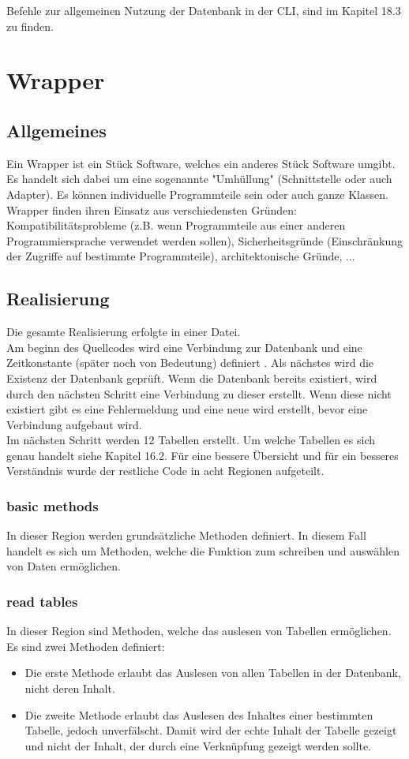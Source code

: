 \documentclass[12pt,a4paper]{report}
\begin{document}
\begin{onehalfspace}
Befehle zur allgemeinen Nutzung der Datenbank in der CLI, sind im Kapitel 18.3 zu finden.

\section{Wrapper}
\subsection{Allgemeines}
Ein Wrapper ist ein Stück Software, welches ein anderes Stück Software umgibt. Es handelt sich dabei um eine sogenannte "{}Umhüllung"{} (Schnittstelle oder auch Adapter). Es können individuelle Programmteile sein oder auch ganze Klassen.\\
Wrapper finden ihren Einsatz aus verschiedensten Gründen: Kompatibilitätsprobleme (z.B. wenn Programmteile aus einer anderen Programmiersprache verwendet werden sollen), Sicherheitsgründe (Einschränkung der Zugriffe auf bestimmte Programmteile), architektonische Gründe, ...

\subsection{Realisierung}
Die gesamte Realisierung erfolgte in einer Datei.
\\Am beginn des Quellcodes wird eine Verbindung zur Datenbank und eine Zeitkonstante (später noch von Bedeutung) definiert . Als nächstes wird die Existenz der Datenbank geprüft. Wenn die Datenbank bereits existiert, wird durch den nächsten Schritt eine Verbindung zu dieser erstellt.
Wenn diese nicht existiert gibt es eine Fehlermeldung und eine neue wird erstellt, bevor eine Verbindung aufgebaut wird.\\
Im nächsten Schritt werden 12 Tabellen erstellt. Um welche Tabellen es sich genau handelt siehe Kapitel 16.2.
Für eine bessere Übersicht und für ein besseres Verständnis wurde der restliche Code in acht Regionen aufgeteilt.
\subsubsection{basic methods}
In dieser Region werden grundsätzliche Methoden definiert. In diesem Fall handelt es sich um Methoden, welche die Funktion zum schreiben und auswählen von Daten ermöglichen.
\subsubsection{read tables}
In dieser Region sind Methoden, welche das auslesen von Tabellen ermöglichen.
Es sind zwei Methoden definiert:
\begin{itemize}
\item Die erste Methode erlaubt das Auslesen von allen Tabellen in der Datenbank, nicht deren Inhalt.
\item Die zweite Methode erlaubt das Auslesen des Inhaltes einer bestimmten Tabelle, jedoch unverfälscht. Damit wird der echte Inhalt der Tabelle gezeigt und nicht der Inhalt, der durch eine Verknüpfung gezeigt werden sollte.
\end{itemize}

\end{onehalfspace}
\end{document}
